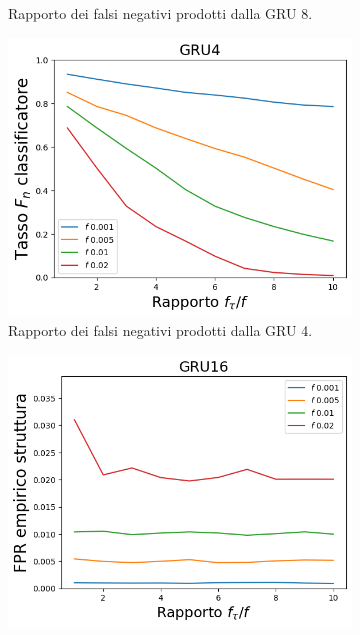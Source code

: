 \documentclass[../../main.tex]{subfiles}
\begin{document}
\begin{figure}[H]
\begin{subfigure}[b]{0.32\textwidth}
            \caption{Rapporto dei falsi negativi prodotti dalla GRU 8.}
            \label{fig:SLBFFNR_GRU8}
        \end{subfigure}
        \begin{subfigure}[b]{0.32\textwidth}
            \centering
            \includegraphics[width = \textwidth]{immagini/7/SLBF/GRU4_FNR.png}
            \caption{Rapporto dei falsi negativi prodotti dalla GRU 4.}
            \label{fig:SLBFFNR_GRU4}
        \end{subfigure}
        \begin{subfigure}[b]{0.32\textwidth}
            \centering
            \includegraphics[width = \textwidth]{immagini/7/SLBF/GRU16_FPR.png}

\end{subfigure}
\end{figure}
\end{document}
